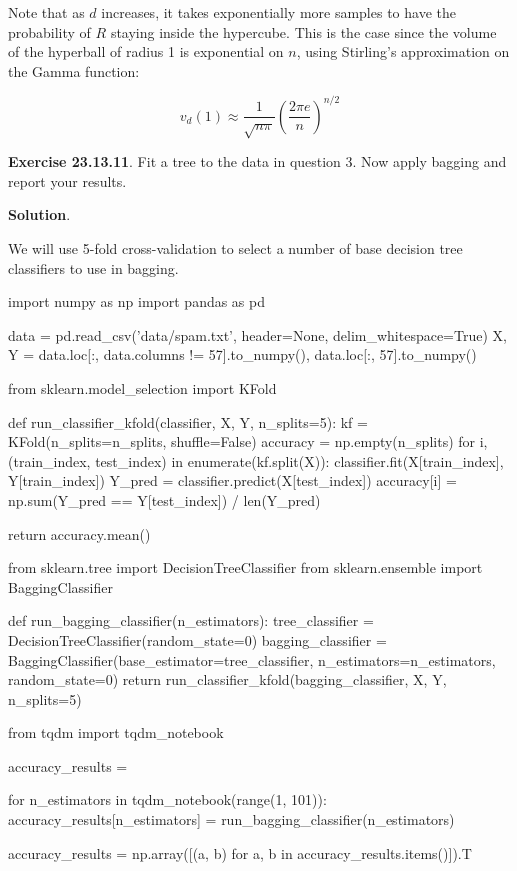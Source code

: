 Note that as \(d\) increases, it takes exponentially more samples to
have the probability of \(R\) staying inside the hypercube. This is the
case since the volume of the hyperball of radius 1 is exponential on
\(n\), using Stirling's approximation on the Gamma function:

\[ v_d(1) \approx \frac{1}{\sqrt{n \pi}} \left( \frac{2 \pi e}{n}\right)^{n/2} \]

\textbf{Exercise 23.13.11}. Fit a tree to the data in question 3. Now
apply bagging and report your results.

\textbf{Solution}.

We will use 5-fold cross-validation to select a number of base decision
tree classifiers to use in bagging.

\begin{python}
import numpy as np
import pandas as pd

data = pd.read_csv('data/spam.txt', header=None, delim_whitespace=True)
X, Y = data.loc[:, data.columns != 57].to_numpy(), data.loc[:, 57].to_numpy()
\end{python}

\begin{python}
from sklearn.model_selection import KFold

def run_classifier_kfold(classifier, X, Y, n_splits=5):
    kf = KFold(n_splits=n_splits, shuffle=False)
    accuracy = np.empty(n_splits)
    for i, (train_index, test_index) in enumerate(kf.split(X)):
        classifier.fit(X[train_index], Y[train_index])
        Y_pred = classifier.predict(X[test_index])
        accuracy[i] = np.sum(Y_pred == Y[test_index]) / len(Y_pred)
    
    return accuracy.mean()
\end{python}

\begin{python}
from sklearn.tree import DecisionTreeClassifier
from sklearn.ensemble import BaggingClassifier

def run_bagging_classifier(n_estimators):
    tree_classifier = DecisionTreeClassifier(random_state=0)
    bagging_classifier = BaggingClassifier(base_estimator=tree_classifier, n_estimators=n_estimators, random_state=0)
    return run_classifier_kfold(bagging_classifier, X, Y, n_splits=5)
\end{python}

\begin{python}
from tqdm import tqdm_notebook

accuracy_results = {}

for n_estimators in tqdm_notebook(range(1, 101)):
    accuracy_results[n_estimators] = run_bagging_classifier(n_estimators)
    
accuracy_results = np.array([(a, b) for a, b in accuracy_results.items()]).T
\end{python}

